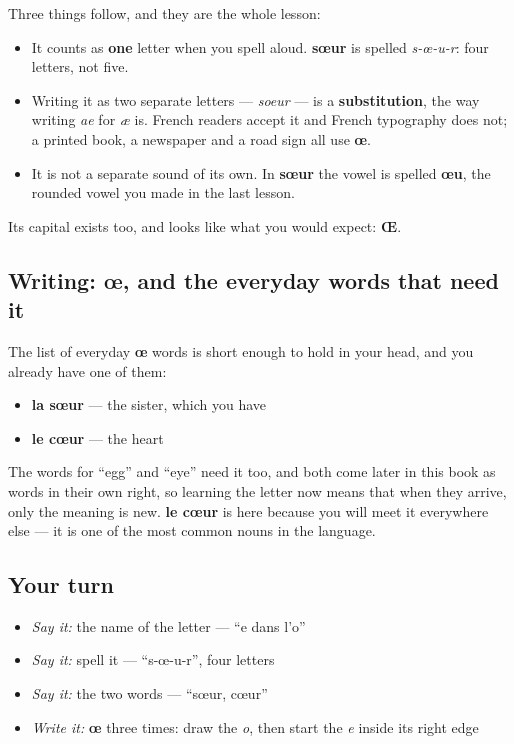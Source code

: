 Three things follow, and they are the whole lesson:

\begin{itemize}
\raggedright
  \item It counts as \textbf{one} letter when you spell aloud. \textbf{sœur} is spelled \emph{s-œ-u-r}: four letters, not five.
  \item Writing it as two separate letters — \emph{soeur} — is a \textbf{substitution}, the way writing \emph{ae} for \emph{æ} is. French readers accept it and French typography does not; a printed book, a newspaper and a road sign all use \textbf{œ}.
  \item It is not a separate sound of its own. In \textbf{sœur} the vowel is spelled \textbf{œu}, the rounded vowel you made in the last lesson.
\end{itemize}

Its capital exists too, and looks like what you would expect: \textbf{Œ}.

\subsection*{Writing: œ, and the everyday words that need it}
The list of everyday \textbf{œ} words is short enough to hold in your head, and you already have one of them:

\begin{itemize}
\raggedright
  \item \textbf{la sœur} — the sister, which you have
  \item \textbf{le cœur} — the heart
\end{itemize}

The words for \textquotedblleft{}egg\textquotedblright{} and \textquotedblleft{}eye\textquotedblright{} need it too, and both come later in this book as words in their own right, so learning the letter now means that when they arrive, only the meaning is new. \textbf{le cœur} is here because you will meet it everywhere else — it is one of the most common nouns in the language.

\subsection*{Your turn}
\begin{itemize}
\raggedright
  \item \emph{Say it:} the name of the letter — \textquotedblleft{}e dans l'o\textquotedblright{}
  \item \emph{Say it:} spell it — \textquotedblleft{}s-œ-u-r\textquotedblright{}, four letters
  \item \emph{Say it:} the two words — \textquotedblleft{}sœur, cœur\textquotedblright{}
  \item \emph{Write it:} \textbf{œ} three times: draw the \emph{o}, then start the \emph{e} inside its right edge
\end{itemize}


